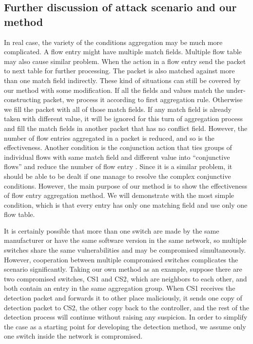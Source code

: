 \subsection{Further discussion of attack scenario and our method}
\label{Further_discussion}

In real case, the variety of the conditions aggregation may be much more complicated. A flow entry might have multiple match fields. Multiple flow table may also cause similar problem. When the action in a flow entry send the packet to next table for further processing. The packet is also matched against more than one match field indirectly. These kind of situations can still be covered by our method with some modification. If all the fields and values match the under-constructing packet, we process it according to first aggregation rule. Otherwise we fill the packet with all of those match fields. If any match field is already taken with different value, it will be ignored for this turn of aggregation process and fill the match fields in another packet that has no conflict field. However, the number of flow entries aggregated in a packet is reduced, and so is the effectiveness. Another condition is the conjunction action that ties groups of individual flows with same match field and different value into ``conjunctive flows'' and reduce the number of flow entry \cite{OVS_OFCTL}. Since it is a similar problem, it should be able to be dealt if one manage to resolve the complex conjunctive conditions. However, the main purpose of our method is to show the effectiveness of flow entry aggregation method. We will demonstrate with the most simple condition, which is that every entry has only one matching field and use only one flow table.

It is certainly possible that more than one switch are made by the same manufacturer or have the same software version in the same network, so multiple switches share the same vulnerabilities and may be compromised simultaneously. However, cooperation between multiple compromised switches complicates the scenario significantly. Taking our own method as an example, suppose there are two compromised switches, CS1 and CS2, which are neighbors to each other, and both contain an entry in the same aggregation group. When CS1 receives the detection packet and forwards it to other place maliciously, it sends one copy of detection packet to CS2, the other copy back to the controller, and the rest of the detection process will continue without raising any suspicion\sout{}. In order to simplify the case as a starting point for developing the detection method, we assume only one switch inside the network is compromised.

